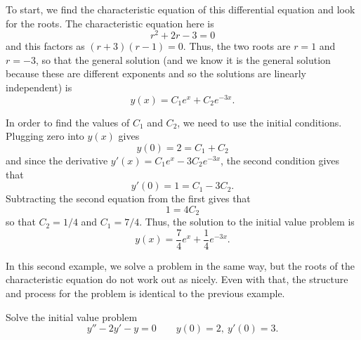 \begin{exampleSol}
To start, we find the characteristic equation of this differential equation and look for the roots. The characteristic equation here is 
\begin{equation*}
r^2 + 2r - 3 = 0
\end{equation*}
and this factors as $(r+3)(r-1) = 0$. Thus, the two roots are $r=1$ and $r=-3$, so that the general solution (and we know it is the general solution because these are different exponents and so the solutions are linearly independent) is
\begin{equation*}
y(x) = C_1e^{x} + C_2e^{-3x}.
\end{equation*}

In order to find the values of $C_1$ and $C_2$, we need to use the initial conditions. Plugging zero into $y(x)$ gives
\begin{equation*}
y(0) = 2 = C_1 + C_2
\end{equation*}
and since the derivative $y'(x) = C_1e^x - 3C_2e^{-3x}$, the second condition gives that
\begin{equation*}
y'(0) = 1 = C_1 - 3C_2.
\end{equation*}
Subtracting the second equation from the first gives that
\begin{equation*}
1 = 4C_2
\end{equation*}
so that $C_2 = 1/4$ and $C_1 = 7/4$. Thus, the solution to the initial value problem is
\begin{equation*}
y(x) = \frac{7}{4}e^x + \frac{1}{4}e^{-3x}.
\end{equation*}
\end{exampleSol}

In this second example, we solve a problem in the same way, but the roots of the characteristic equation do not work out as nicely. Even with that, the structure and process for the problem is identical to the previous example.

\begin{example}
Solve the initial value problem 
\begin{equation*}
y'' - 2y' - y = 0 \qquad y(0) = 2,\ y'(0) = 3.
\end{equation*}
\end{example}

